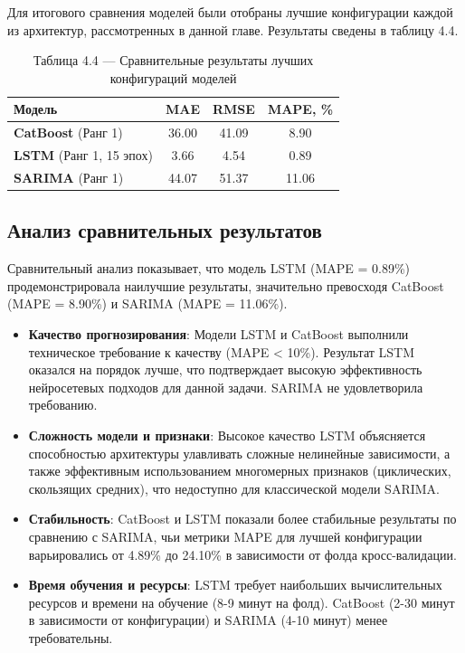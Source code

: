 \hspace*{1.25cm}Для итогового сравнения моделей были отобраны лучшие конфигурации каждой из архитектур, рассмотренных в данной главе. Результаты сведены в таблицу 4.4.

\begin{table}[H]
	\centering
	\caption*{Таблица 4.4 --- Сравнительные результаты лучших конфигураций моделей}
	\begin{tabular}{|l|c|c|c|}
		\hline
		\textbf{Модель} & \textbf{MAE} & \textbf{RMSE} & \textbf{MAPE, \%} \\
		\hline
		\textbf{CatBoost} (Ранг 1) & 36.00 & 41.09 & 8.90 \\
		\hline
		\textbf{LSTM} (Ранг 1, 15 эпох) & 3.66 & 4.54 & 0.89 \\
		\hline
		\textbf{SARIMA} (Ранг 1) & 44.07 & 51.37 & 11.06 \\
		\hline
	\end{tabular}
	\label{tab:comparison_results}
\end{table}

\subsection{Анализ сравнительных результатов}

\hspace*{1.25cm}Сравнительный анализ показывает, что модель LSTM (MAPE = 0.89\%) продемонстрировала наилучшие результаты, значительно превосходя CatBoost (MAPE = 8.90\%) и SARIMA (MAPE = 11.06\%).

\begin{itemize}
    \item \textbf{Качество прогнозирования}: Модели LSTM и CatBoost выполнили техническое требование к качеству (MAPE < 10\%). Результат LSTM оказался на порядок лучше, что подтверждает высокую эффективность нейросетевых подходов для данной задачи. SARIMA не удовлетворила требованию.
    
    \item \textbf{Сложность модели и признаки}: Высокое качество LSTM объясняется способностью архитектуры улавливать сложные нелинейные зависимости, а также эффективным использованием многомерных признаков (циклических, скользящих средних), что недоступно для классической модели SARIMA.
    
    \item \textbf{Стабильность}: CatBoost и LSTM показали более стабильные результаты по сравнению с SARIMA, чьи метрики MAPE для лучшей конфигурации варьировались от 4.89\% до 24.10\% в зависимости от фолда кросс-валидации.
    
    \item \textbf{Время обучения и ресурсы}: LSTM требует наибольших вычислительных ресурсов и времени на обучение (8-9 минут на фолд). CatBoost (2-30 минут в зависимости от конфигурации) и SARIMA (4-10 минут) менее требовательны.
\end{itemize}

